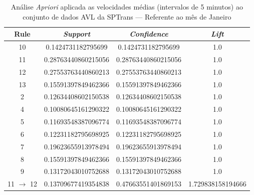 \documentclass[
	12pt,				%
	oneside,			%
	a4paper,			%
	english,			%
	brazil				%
	]{abntex2ppgsi}
\begin{document}
\begin{apendicesenv}
\begin{table}[!htb]
\centering
\caption {Análise \textit{Apriori} aplicada as velocidades médias (intervalos de 5 minutos) ao conjunto de dados AVL da SPTrans --- Referente ao mês de Janeiro}
\label {tab:aprioriJanuary}
\begin{tabular}{c|c|c|c}
\hline
\textbf{Rule} & \textit{\textbf{Support}} & \textit{\textbf{Confidence}} & \textit{\textbf{Lift}} \\
\hline
10 &  0.1424731182795699 &  0.1424731182795699 &  1.0\\
\hline
11 &  0.28763440860215056 &  0.28763440860215056 &  1.0\\
\hline
12 &  0.27553763440860213 &  0.27553763440860213 &  1.0\\
\hline
13 &  0.15591397849462366 &  0.15591397849462366 &  1.0\\
\hline
2 &  0.12634408602150538 &  0.12634408602150538 &  1.0\\
\hline
4 &  0.10080645161290322 &  0.10080645161290322 &  1.0\\
\hline
5 &  0.11693548387096774 &  0.11693548387096774 &  1.0\\
\hline
6 &  0.12231182795698925 &  0.12231182795698925 &  1.0\\
\hline
7 &  0.19623655913978494 &  0.19623655913978494 &  1.0\\
\hline
8 &  0.15591397849462366 &  0.15591397849462366 &  1.0\\
\hline
9 &  0.13172043010752688 &  0.13172043010752688 &  1.0\\
\hline
11 $\rightarrow$ 12 &  0.13709677419354838 &  0.47663551401869153 &  1.729838158194666\\
\hline
\end{tabular}
\end{table}


\end{apendicesenv}
\end{document}
